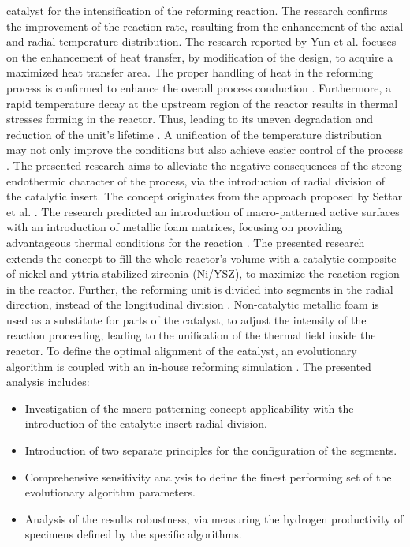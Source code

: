 \documentclass[preprint,12pt]{elsarticle}
\begin{document}
catalyst for the intensification of the reforming reaction. The research confirms the improvement of the reaction rate, resulting from the enhancement of the axial and radial temperature distribution. The research reported by Yun et al. \cite{Yun2019}  focuses on the enhancement of heat transfer, by modification of the design, to acquire a maximized heat transfer area. The proper handling of heat in the reforming process is confirmed to enhance the overall process conduction \cite{Dubinin2018}.  Furthermore, a rapid temperature decay at the upstream region of the reactor results in thermal stresses forming in the reactor. Thus, leading to its uneven degradation and reduction of the unit's lifetime \cite{Mozdzierz2016}. A unification of the temperature distribution may not only improve the conditions but also achieve easier control of the process \cite{Mozdzierz2018}. The presented research aims to alleviate the negative consequences of the strong endothermic character of the process, via the introduction of radial division of the catalytic insert. The concept originates from the approach proposed by Settar et al. \cite{Settar2017}. The research predicted an introduction of macro-patterned active surfaces with an introduction of metallic foam matrices, focusing on providing advantageous thermal conditions for the reaction \cite{Settar2018a, Settar2018c}.  The presented research extends the concept to fill the whole reactor's volume with a catalytic composite of nickel and yttria-stabilized zirconia (Ni/YSZ), to maximize the reaction region in the reactor. Further, the reforming unit is divided into segments in the radial direction, instead of the longitudinal division \cite{Pajak2018}. Non-catalytic metallic foam is used as a substitute for parts of the catalyst, to adjust the intensity of the reaction proceeding, leading to the unification of the thermal field inside the reactor. To define the optimal alignment of the catalyst, an evolutionary algorithm is coupled with an in-house reforming simulation \cite{Pajak2021IJHEb}. The presented analysis includes:
 
 \begin{itemize}
 \item {Investigation of the macro-patterning concept applicability with the introduction of the catalytic insert radial division.}
 \item {Introduction of two separate principles for the configuration of the segments.}
 \item {Comprehensive sensitivity analysis to define the finest performing set of the evolutionary algorithm parameters.}
 \item {Analysis of the results robustness, via measuring the hydrogen productivity of specimens defined by the specific algorithms.}
 \end{itemize}
\end{document}
